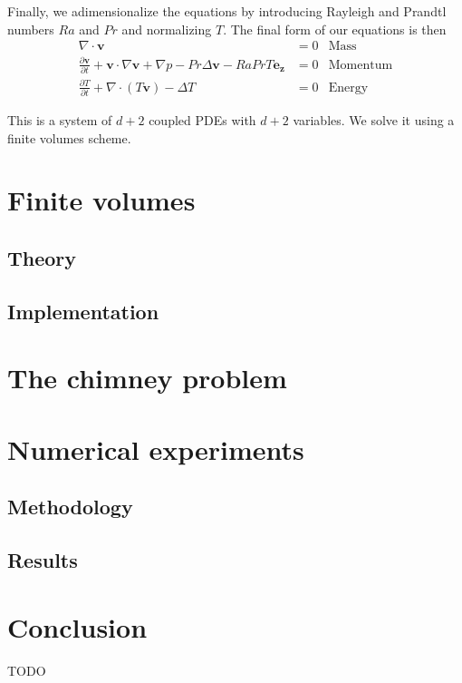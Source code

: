 \documentclass[12pt]{article}
\newcommand{\vb}[1]{\ensuremath{\mathbf{#1}}}
\begin{document}
Finally, we adimensionalize the equations by introducing Rayleigh and
Prandtl numbers $Ra$ and $Pr$ and normalizing $T$. The final form of our equations is then
\begin{align}
  \nabla \cdot \vb{v} &= 0& \text{Mass}\\
  \frac{\partial \mathbf{v}}{\partial t} + \mathbf{v} \cdot
    \nabla \mathbf{v} +\nabla p - Pr \Delta \vb{v} - Ra Pr T
  \vb{e_z} &= 0& \text{Momentum}\\
  \frac{\partial T}{\partial t} + \nabla \cdot (T \vb{v}) - \Delta
  T&=0& \text{Energy}
\end{align}

This is a system of $d + 2$ coupled PDEs with $d+2$ variables. We
solve it using a finite volumes scheme.

\section{Finite volumes}
\subsection{Theory}
\subsection{Implementation}
\section{The chimney problem}
\section{Numerical experiments}
\subsection{Methodology}
\subsection{Results}
\section{Conclusion}
TODO
\listoffigures


\begin{thebibliography}{99}
\end{thebibliography}
\end{document}

